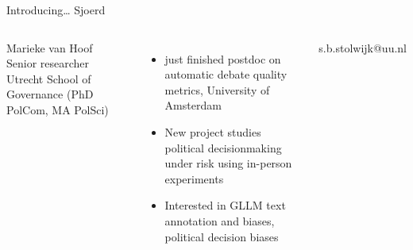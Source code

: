 \documentclass[compress]{beamer}
\begin{document}
\begin{frame}{Introducing\ldots} {\huge{Sjoerd}} \small{} 
\begin{columns}[]    Marieke van Hoof \\ 
Senior researcher Utrecht School of Governance (PhD PolCom, MA PolSci)\\
\begin{itemize} 
    \item just finished postdoc on automatic debate quality metrics, University of Amsterdam
	\item New project studies political decisionmaking under risk using in-person experiments
	\item Interested in GLLM text annotation and biases, political decision biases
\end{itemize} s.b.stolwijk@uu.nl 
\end{columns} 
\end{frame}
\end{document}
